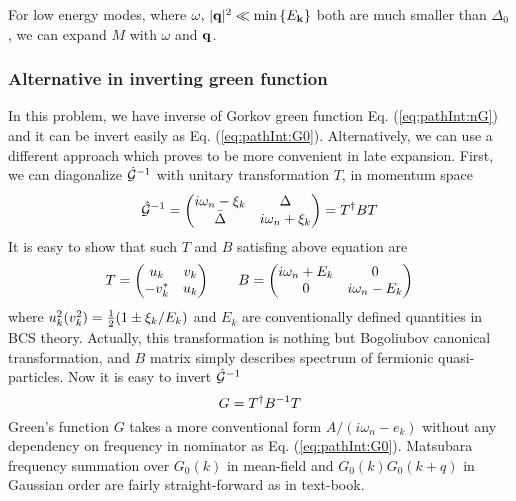 For low energy modes, where $\omega,\,\lvert{\ensuremath{\mathbf{q}}}\rvert^{2}\ll\min\left\{E_{\mathbf{k}}\right\}$ both are much smaller than $\Delta_{0}$, we can expand $M$ with $\omega$ and $\mathbf{q}$.  


\subsubsection{Alternative in inverting green function\label{sec:diagonalizeGreen1}}
In this problem, we have inverse of Gorkov green function Eq. (\ref{eq:pathInt:nG}) and it can be invert easily as Eq. (\ref{eq:pathInt:G0}).   Alternatively, we can use a different approach which proves to be more convenient in late expansion.  First, we can diagonalize $\hat{\mathcal{G}}^{-1}$ with unitary transformation $T$, in momentum space
\begin{equation}
\hat{\mathcal{G}}^{-1}=\begin{pmatrix}i\omega_{n}-\xi_{k}&\Delta\\\bar\Delta&i\omega_{n}+\xi_{k}\end{pmatrix}=T^{\dagger}BT
\end{equation}
It is easy to show that such $T$ and $B$ satisfing above equation are
\begin{equation}
T=\begin{pmatrix}u_{k}&v_{k}\\-v_{k}^{*}&u_{k}\end{pmatrix}\qquad{}B=\begin{pmatrix}i\omega_{n}+E_{k}&0\\0&i\omega_{n}-E_{k}\end{pmatrix}
\end{equation}
where $u_{k}^{2}(v_{k}^{2})=\frac{1}{2}(1\pm\xi_{k}/E_{k})$ and $E_{k}$ are conventionally defined quantities in BCS theory.   Actually, this transformation is nothing but Bogoliubov canonical transformation, and $B$ matrix simply describes spectrum of fermionic quasi-particles.  Now it is easy to invert $\hat{\mathcal{G}}^{-1}$
\begin{equation}
G=T^{\dagger}B^{-1}T
\end{equation}
Green's function $G$ takes a more conventional form $A/(i\omega_{n}-e_{k})$ without any dependency on frequency in nominator as Eq. (\ref{eq:pathInt:G0}). Matsubara frequency summation over $G_{0}(k)$ in mean-field and $G_{0}(k)G_{0}(k+q)$ in Gaussian order are fairly straight-forward as in text-book.  
